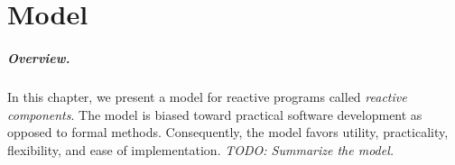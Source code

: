 \chapter{Model \label{model}}

\paragraph{Overview.}
In this chapter, we present a model for reactive programs called \emph{reactive components}.
The model is biased toward practical software development as opposed to formal methods.
Consequently, the model favors utility, practicality, flexibility, and ease of implementation.
\emph{TODO:  Summarize the model.}




